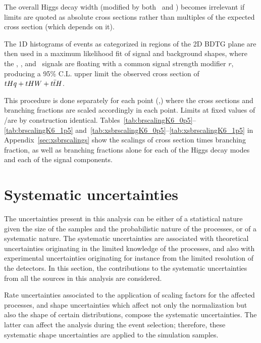 The overall Higgs decay width (modified by both \Ct\ and \CV) becomes irrelevant if limits are quoted as absolute cross sections rather than multiples of the expected cross section (which depends on it).


The 1D histograms of events as categorized in regions of the 2D BDTG plane are then used in a maximum likelihood fit of signal and background shapes, where the \tHq, \tHW, and \ttH\ signals are floating with a common signal strength modifier $r$, producing a 95\% C.L. upper limit the observed cross section of $tHq+tHW+t\bar{t}H$.

This procedure is done separately for each point  (\Ct,\CV) where the cross sections and branching fractions are scaled accordingly in each point. Limits at fixed values of \Ct/\CV are by construction identical.
Tables~\ref{tab:brscalingK6_0p5}--\ref{tab:brscalingK6_1p5} and~\ref{tab:xsbrscalingK6_0p5}--\ref{tab:xsbrscalingK6_1p5} in Appendix~\ref{sec:xsbrscalings} show the scalings of cross section times branching fraction, as well as branching fractions alone for each of the Higgs decay modes and each of the signal components. 


\section{Systematic uncertainties}

The uncertainties present in this analysis can be either of a statistical nature given the size of the samples and the probabilistic nature of the processes, or of a systematic nature. The systematic uncertainties are associated with theoretical uncertainties originating in the limited knowledge of the processes, and also with experimental uncertainties originating for instance from the limited resolution of the detectors. In this section, the contributions to the systematic uncertainties from all the sources in this analysis are considered.

Rate uncertainties associated to the application of scaling factors for the affected processes, and shape uncertainties which affect not only the normalization but also the shape of certain distributions, compose the systematic uncertainties. The latter can affect the analysis during the event selection; therefore, these systematic shape uncertainties are applied to the simulation samples.

